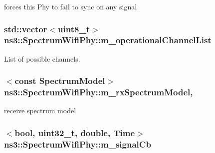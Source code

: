 forces this Phy to fail to sync on any signal 

\subsubsection[{\texorpdfstring{m\+\_\+operational\+Channel\+List}{m_operationalChannelList}}]{\setlength{\rightskip}{0pt plus 5cm}std\+::vector$<$uint8\+\_\+t$>$ ns3\+::\+Spectrum\+Wifi\+Phy\+::m\+\_\+operational\+Channel\+List\hspace{0.3cm}{\ttfamily [private]}}\hypertarget{classns3_1_1SpectrumWifiPhy_a8658f020e635d4d689bb99d1e71e81c1}{}\label{classns3_1_1SpectrumWifiPhy_a8658f020e635d4d689bb99d1e71e81c1}


List of possible channels. 

\subsubsection[{\texorpdfstring{m\+\_\+rx\+Spectrum\+Model}{m_rxSpectrumModel}}]{$<$const {\bf Spectrum\+Model}$>$ ns3\+::\+Spectrum\+Wifi\+Phy\+::m\+\_\+rx\+Spectrum\+Model\hspace{0.3cm}{\ttfamily [mutable]}, {\ttfamily [private]}}\hypertarget{classns3_1_1SpectrumWifiPhy_ad3fd35b0100f628c126092dde86a939c}{}\label{classns3_1_1SpectrumWifiPhy_ad3fd35b0100f628c126092dde86a939c}


receive spectrum model 

\subsubsection[{\texorpdfstring{m\+\_\+signal\+Cb}{m_signalCb}}]{$<$bool, uint32\+\_\+t, double, {\bf Time}$>$ ns3\+::\+Spectrum\+Wifi\+Phy\+::m\+\_\+signal\+Cb\hspace{0.3cm}{\ttfamily [private]}}\hypertarget{classns3_1_1SpectrumWifiPhy_a0be57ff837cdbd31902f670ea5bbabe2}{}\label{classns3_1_1SpectrumWifiPhy_a0be57ff837cdbd31902f670ea5bbabe2}


